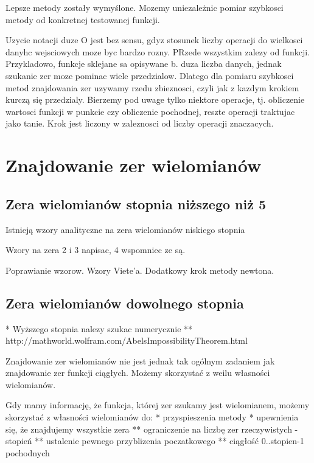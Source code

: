 \documentclass[11pt,a4paper,oneside]{report}
\begin{document}
Lepsze metody zostały wymyślone. Mozemy uniezależnic pomiar szybkosci metody od konkretnej testowanej funkcji.

Uzycie notacji duze O jest bez sensu, gdyz stosunek liczby operacji do wielkosci danyhc wejsciowych moze byc bardzo rozny. PRzede wszystkim zalezy od funkcji. Przykladowo, funkcje sklejane sa opisywane b. duza liczba danych, jednak szukanie zer moze pominac wiele przedzialow. Dlatego dla pomiaru szybkosci metod znajdowania zer uzywamy rzedu zbieznosci, czyli jak z kazdym krokiem kurczą się przedzialy. Bierzemy pod uwage tylko niektore operacje, tj. obliczenie wartosci funkcji w punkcie czy obliczenie pochodnej, reszte operacji traktujac jako tanie. Krok jest liczony w zaleznosci od liczby operacji znaczacych.

\section{Znajdowanie zer wielomianów}

\subsection{Zera wielomianów stopnia niższego niż 5}

Istnieją wzory analityczne na zera wielomianów niskiego stopnia

Wzory na zera 2 i 3 napisac, 4 wspomniec ze są.

Poprawianie wzorow. Wzory Viete'a. Dodatkowy krok metody newtona.

\subsection{Zera wielomianów dowolnego stopnia}

* Wyższego stopnia nalezy szukac numerycznie
** http://mathworld.wolfram.com/AbelsImpossibilityTheorem.html

Znajdowanie zer wielomianów nie jest jednak tak ogólnym zadaniem jak znajdowanie zer funkcji ciągłych. Możemy skorzystać z weilu własności wielomianów.

Gdy mamy informację, że funkcja, której zer szukamy jest wielomianem, możemy skorzystać z własności wielomianów do:
* przyspieszenia metody
* upewnienia się, że znajdujemy wszystkie zera
** ograniczenie na liczbę zer rzeczywistych - stopień
** ustalenie pewnego przyblizenia poczatkowego
** ciągłość 0..stopien-1 pochodnych
\end{document}
